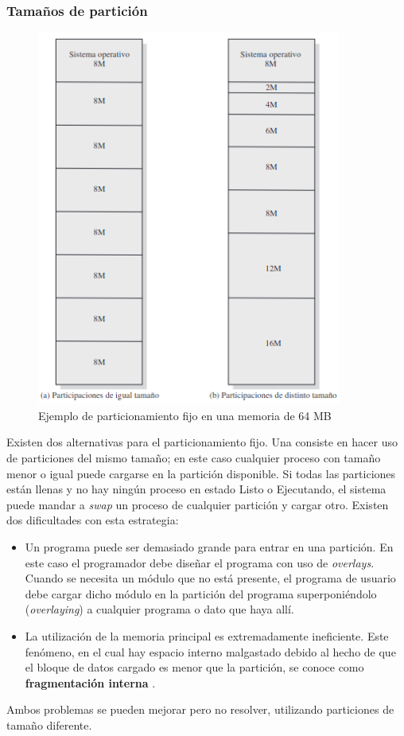 \documentclass[12pt,a4paper]{article}
\begin{document}
\subsubsection{Tamaños de partición}
\begin{figure}[H]
    \centering
    \includegraphics[width=10cm]{particionfija.png}\par
    \caption{Ejemplo de particionamiento fijo en una memoria de 64 MB}
\end{figure}
Existen dos alternativas para el particionamiento fijo. Una consiste en hacer uso de particiones del mismo tamaño; en este caso cualquier proceso con tamaño menor o igual puede cargarse en la partición disponible. Si todas las particiones están llenas y no hay ningún proceso en estado Listo o Ejecutando, el sistema puede mandar a \textit{swap} un proceso de cualquier partición y cargar otro. Existen dos dificultades con esta estrategia:
\begin{itemize}
    \item Un programa puede ser demasiado grande para entrar en una partición. En este caso el programador debe diseñar el programa con uso de \textit{overlays}. Cuando se necesita un módulo que no está presente, el programa de usuario debe cargar dicho módulo en la partición del programa superponiéndolo (\textit{overlaying}) a cualquier programa o dato que haya allí.
    \item La utilización de la memoria principal es extremadamente ineficiente. Este fenómeno, en el cual hay espacio interno malgastado debido al hecho de que el bloque de datos cargado es menor que la partición, se conoce como \textbf{fragmentación interna} .
\end{itemize}
Ambos problemas se pueden mejorar pero no resolver, utilizando particiones de tamaño diferente.
\end{document}
